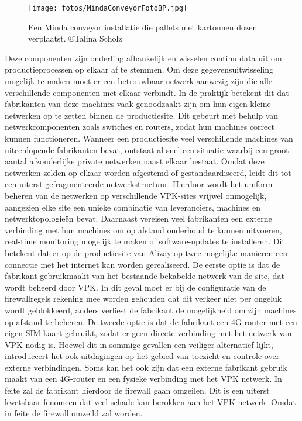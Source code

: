 \begin{figure}[H]
    \centering
    \texttt{[image: fotos/MindaConveyorFotoBP.jpg]}
    \caption[Minda Conveyor]{\label{fig:grail} Een Minda conveyor installatie die pallets met kartonnen dozen verplaatst. ©Talina Scholz}
\end{figure} 

Deze componenten zijn onderling afhankelijk en wisselen continu data uit om productieprocessen op elkaar af te stemmen. Om deze gegevensuitwisseling mogelijk te maken moet er een betrouwbaar netwerk aanwezig zijn die alle verschillende componenten met elkaar verbindt.
In de praktijk betekent dit dat fabrikanten van deze machines vaak genoodzaakt zijn om hun eigen kleine netwerken op te zetten binnen de productiesite. Dit gebeurt met behulp van netwerkcomponenten zoals switches en routers, zodat hun machines correct kunnen functioneren. Wanneer een productiesite veel verschillende machines van uiteenlopende fabrikanten bevat, ontstaat al snel een situatie waarbij een groot aantal afzonderlijke private netwerken naast elkaar bestaat. Omdat deze netwerken zelden op elkaar worden afgestemd of gestandaardiseerd, leidt dit tot een uiterst gefragmenteerde netwerkstructuur. Hierdoor wordt het uniform beheren van de netwerken op verschillende VPK-sites vrijwel onmogelijk, aangezien elke site een unieke combinatie van leveranciers, machines en netwerktopologieën bevat.
Daarnaast vereisen veel fabrikanten een externe verbinding met hun machines om op afstand onderhoud te kunnen uitvoeren, real-time monitoring mogelijk te maken of software-updates te installeren. Dit betekent dat er op de productiesite van Alizay op twee mogelijke manieren een connectie met het internet kan worden gerealiseerd. De eerste optie is dat de fabrikant gebruikmaakt van het bestaande bekabelde netwerk van de site, dat wordt beheerd door VPK. In dit geval moet er bij de configuratie van de firewallregels rekening mee worden gehouden dat dit verkeer niet per ongeluk wordt geblokkeerd, anders verliest de fabrikant de mogelijkheid om zijn machines op afstand te beheren.
De tweede optie is dat de fabrikant een 4G-router met een eigen SIM-kaart gebruikt, zodat er geen directe verbinding met het netwerk van VPK nodig is. Hoewel dit in sommige gevallen een veiliger alternatief lijkt, introduceert het ook uitdagingen op het gebied van toezicht en controle over externe verbindingen. Soms kan het ook zijn dat een externe fabrikant gebruik maakt van een 4G-router en een fysieke verbinding met het VPK netwerk. In feite zal de fabrikant hierdoor de firewall gaan omzeilen. Dit is een uiterst kwetsbaar fenomeen dat veel schade kan berokken aan het VPK netwerk. Omdat in feite de firewall omzeild zal worden.
